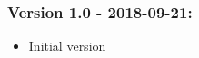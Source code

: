 \begin{titlepage}
\subsubsection*{Version 1.0 - 2018-09-21:}
	\begin{itemize}
	\item Initial version
	\end{itemize}


\end{titlepage}